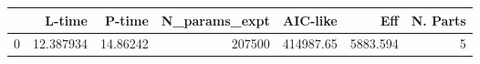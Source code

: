 \begin{tabular}{lrrrrrr}
\toprule
{} &     L-time &    P-time &  N\_params\_expt &   AIC-like &       Eff &  N. Parts \\
\midrule
0 &  12.387934 &  14.86242 &         207500 &  414987.65 &  5883.594 &         5 \\
\bottomrule
\end{tabular}
